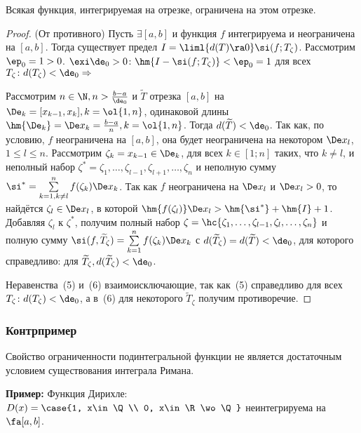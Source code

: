 \documentclass[a4paper]{article}
\begin{document}
\begin{theorem}
Всякая функция, интегрируемая на отрезке, ограничена на этом
отрезке.
\end{theorem}
\begin{proof}
(От противного) Пусть $\exi [a,b]$ и функция $f$ интегрируема и
неограничена на $[a,b]$. Тогда существует предел
$I=\liml{d(T)\ra0}\si(f;T_\zeta)$. Рассмотрим $\ep_0=1>0$. $\exi
\de_0>0\colon \hm{I-\si(f;T_\zeta)}<\ep_0=1$ для всех $T_\zeta\colon
d(T_\zeta)<\de_0 \Rightarrow$

Рассмотрим $n\in\N, n>\frac{b-a}{\de_0}$ и $\widetilde T$ отрезка
$[a,b]$ на $\De_k=[x_{k-1},x_k],k=\ol{1,n}$, одинаковой
длины $\hm{\De_k}=\De x_k=\frac{b-a}n, k=\ol{1,n}$.
Тогда $d(\widetilde T)<\de_0$. Так как, по условию, $f$
неограничена на $[a,b]$, она будет неограничена на некотором $\De
x_l$, $1\le l\le n$. Рассмотрим $\zeta_k=x_{k-1}\in\De_k$, для
всех $k\in[1;n]$ таких, что $k\ne l$, и неполный набор
$\zeta^{*}={\zeta_1,\dots,\zeta_{l-1},\zeta_{l+1},\dots,\zeta_n}$ и
неполную сумму $\si^{*}=\sum\limits_{k=1,k\ne l}^{n}
f(\zeta_k)\De x_k$. Так как $f$ неограничена на $\De x_l$ и
$\De x_l>0$, то найдётся $\zeta_l\in\De x_l$, в которой
$\hm{f(\zeta_l)}\De x_l>\hm{\si^{*}}+\hm{I}+1$. Добавляя
$\zeta_l$ к $\zeta^{*}$, получим полный набор
$\zeta=\hc{\zeta_1,\dots,\zeta_{l-1},\zeta_l,\dots,\zeta_n}$ и
полную сумму $\si(f,\widetilde T_\zeta)=\sum\limits_{k=1}^n
f(\zeta_k)\De x_k$ с $d(\widetilde T_\zeta)=d(\widetilde
T)<\de_0$, для которого справедливо:
для $\widetilde T_\zeta, d(\widetilde T_\zeta)<\de_0$.

Неравенства~(5) и~(6) взаимоисключающие, так как~(5) справедливо для
всех $T_\zeta\colon d(T_\zeta)<\de_0$, а в~(6) для некоторого
$\widetilde T_\zeta$ получим противоречие.
\end{proof}

\subsubsection{Контрпример}

Свойство ограниченности подинтегральной функции не является
достаточным условием существования интеграла Римана.

{\bfseries Пример: } Функция Дирихле: $D(x)=\case{1, x\in\Q \\ 0,
x\in\R\wo\Q}$ неинтегрируема на $\fa [a,b]$.
\end{document}
